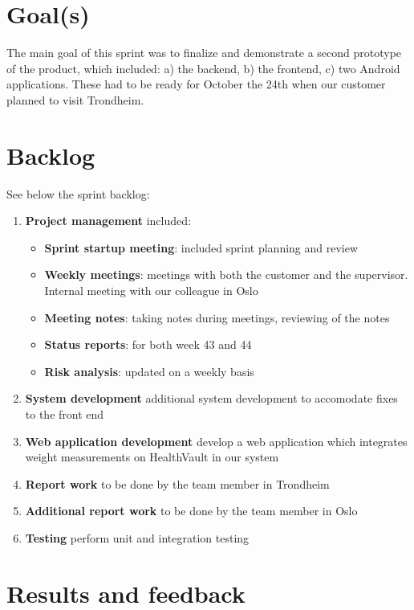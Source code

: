 \section{Goal(s)}

The main goal of this sprint was to finalize and demonstrate a second prototype of the product,
which included: a) the backend, b) the frontend, c) two Android applications.
These had to be ready for October the 24th when our customer planned to visit Trondheim.

\section{Backlog}
See below the sprint backlog:
\begin{enumerate}[1.]
\item \textbf{Project management} included:
	\begin{itemize}
		\item \textbf{Sprint startup meeting}:
			included sprint planning and review
		\item \textbf{Weekly meetings}: 
			meetings with both the customer and the supervisor. Internal meeting with our colleague in Oslo
		\item \textbf{Meeting notes}:
			taking notes during meetings, reviewing of the notes
		\item \textbf{Status reports}:
			for both week 43 and 44
		\item \textbf{Risk analysis}:
			updated on a weekly basis
	\end{itemize}
	\item \textbf{System development}
		additional system development to accomodate fixes to the front end
	\item \textbf{Web application development}
		develop a web application which integrates weight measurements
		on HealthVault in our system
	\item \textbf{Report work}
		to be done by the team member in Trondheim
	\item \textbf{Additional report work}
		to be done by the team member in Oslo
	\item \textbf{Testing}
		perform unit and integration testing
\end{enumerate}

\section{Results and feedback}

